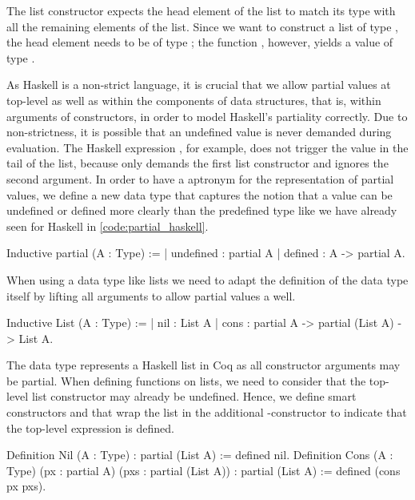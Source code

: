 The list constructor  expects the head element of the list to match its type with all the remaining elements of the list.
Since we want to construct a list of type , the head element needs to be of type ; the function , however, yields a value of type .

As Haskell is a non\--strict language, it is crucial that we allow partial values at top\--level as well as within the components of data structures, that is, within arguments of constructors, in order to model Haskell's partiality correctly.
Due to non\--strictness, it is possible that an undefined value is never demanded during evaluation.
The Haskell expression , for example, does not trigger the  value in the tail of the list, because  only demands the first list constructor and ignores the second argument.
In order to have a aptronym for the representation of partial values, we define a new data type  that captures the notion that a value can be undefined or defined more clearly than the predefined type  like we have already seen for Haskell in \autoref{code:partial_haskell}.

\begin{coqcode}
Inductive partial (A : Type) :=
| undefined : partial A
| defined   : A -> partial A.
\end{coqcode}

When using a data type like lists we need to adapt the definition of the data type itself by lifting all arguments to allow partial values a well.

\begin{coqcode}
Inductive List (A : Type) :=
| nil : List A
| cons : partial A -> partial (List A) -> List A.
\end{coqcode}

The data type  represents a Haskell list in Coq as all constructor arguments may be partial.
When defining functions on lists, we need to consider that the top\--level list constructor may already be undefined.
Hence, we define smart constructors  and  that wrap the list in the additional \--constructor to indicate that the top\--level expression is defined.

\begin{coqcode}
Definition Nil (A : Type) : partial (List A) :=
  defined nil.
Definition Cons (A : Type) (px : partial A) (pxs : partial (List A)) 
  : partial (List A) :=
  defined (cons px pxs).
\end{coqcode}

